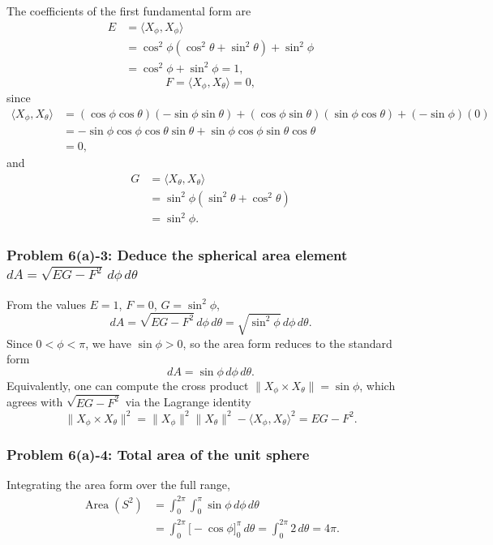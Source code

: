 \documentclass[11pt]{article}
\begin{document}
The coefficients of the first fundamental form are
\[
\begin{aligned}
 E&=\langle X_\phi,X_\phi\rangle\\
 &=\cos^2\phi(\cos^2\theta+\sin^2\theta)+\sin^2\phi\\
 &=\cos^2\phi+\sin^2\phi=1,
\end{aligned}
\]
\[
 F=\langle X_\phi,X_\theta\rangle=0,
\]
since
\[
\begin{aligned}
 \langle X_\phi,X_\theta\rangle
 &=
 (\cos\phi\cos\theta)(-\sin\phi\sin\theta)
 +(\cos\phi\sin\theta)(\sin\phi\cos\theta)
 +(-\sin\phi)(0)\\
 &=
 -\sin\phi\cos\phi\cos\theta\sin\theta
 +\sin\phi\cos\phi\sin\theta\cos\theta\\
 &=0,
\end{aligned}
\]
and
\[
\begin{aligned}
 G&=\langle X_\theta,X_\theta\rangle\\
 &=\sin^2\phi(\sin^2\theta+\cos^2\theta)\\
 &=\sin^2\phi.
\end{aligned}
\]

\subsubsection*{Problem 6(a)-3: Deduce the spherical area element $dA=\sqrt{EG-F^2}\,d\phi\,d\theta$}

From the values $E=1$, $F=0$, $G=\sin^2\phi$,
\[
 dA=\sqrt{EG-F^2}\,d\phi\,d\theta
 =
 \sqrt{\sin^2\phi}\,d\phi\,d\theta.
\]
Since $0<\phi<\pi$, we have $\sin\phi>0$, so the area form reduces to the standard form
\[
 dA=\sin\phi\,d\phi\,d\theta.
\]
Equivalently, one can compute the cross product $\|X_\phi\times X_\theta\|=\sin\phi$, which agrees with $\sqrt{EG-F^2}$ via the Lagrange identity
\[
 \|X_\phi\times X_\theta\|^2
 =
 \|X_\phi\|^2\|X_\theta\|^2-\langle X_\phi,X_\theta\rangle^2
 =
 EG-F^2.
\]

\subsubsection*{Problem 6(a)-4: Total area of the unit sphere}

Integrating the area form over the full range,
\[
\begin{aligned}
 \operatorname{Area}(S^2)
 &=
 \int_0^{2\pi}\int_0^\pi
 \sin\phi\,d\phi\,d\theta\\
 &=
 \int_0^{2\pi}\bigl[-\cos\phi\bigr]_0^\pi\,d\theta
 =
 \int_0^{2\pi}2\,d\theta
 =4\pi.
\end{aligned}
\]
\end{document}

